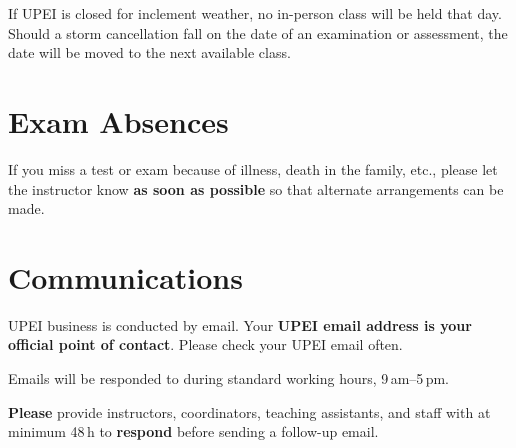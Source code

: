 If UPEI is closed for inclement weather, no in-person class will be held that day. Should a storm cancellation fall on the date of an examination or assessment, the date will be moved to the next available class.

\section{Exam Absences}

If you miss a test or exam because of illness, death in the family, etc., please let the instructor know \textbf{as soon as possible} so that alternate arrangements can be made.

\section{Communications}

UPEI business is conducted by email. Your \textbf{UPEI email address is your official point of contact}. Please check your UPEI email often.

Emails will be responded to during standard working hours, 9\,am--5\,pm.

\textbf{Please} provide instructors, coordinators, teaching assistants, and staff with at minimum 48\,h to \textbf{respond} before sending a follow-up email.

